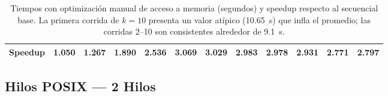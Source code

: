 \documentclass{article}
\begin{document}
\begin{table}[H]
\begin{tabular}{|c|c|c|c|c|c|c|c|c|c|c|c|}
\hline
\textbf{Speedup} & \textbf{1.050} & \textbf{1.267} & \textbf{1.890} & \textbf{2.536} & \textbf{3.069} & \textbf{3.029} & \textbf{2.983} & \textbf{2.978} & \textbf{2.931} & \textbf{2.771} & \textbf{2.797} \\
\hline
\end{tabular}
\caption{Tiempos con optimización manual de acceso a memoria (segundos) y speedup respecto al secuencial base. La primera corrida de $k=10$ presenta un valor atípico (10.65~s) que infla el promedio; las corridas 2--10 son consistentes alrededor de 9.1~s.}
\label{tab:memoria}
\end{table}

\subsection{Hilos POSIX --- 2 Hilos}
\end{document}
